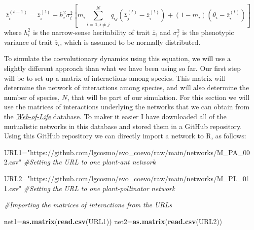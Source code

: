 \documentclass[
]{book}
\newenvironment{Shaded}{\begin{snugshade}}{\end{snugshade}}
\newcommand{\CommentTok}[1]{\textcolor[rgb]{0.56,0.35,0.01}{\textit{#1}}}
\newcommand{\FunctionTok}[1]{\textcolor[rgb]{0.13,0.29,0.53}{\textbf{#1}}}
\newcommand{\NormalTok}[1]{#1}
\newcommand{\OtherTok}[1]{\textcolor[rgb]{0.56,0.35,0.01}{#1}}
\newcommand{\StringTok}[1]{\textcolor[rgb]{0.31,0.60,0.02}{#1}}
\begin{document}
\[
\overline{z}_i^{(t+1)}=\overline{z}_i^{(t)}+h_{i}^2\sigma^2_{i}\left[m_{i}\sum_{i=1, i\neq j}^{N}q_{ij}(\overline{z}_j^{(t)}-\overline{z}_i^{(t)})+(1-m_{i})(\theta_{i}-\overline{z}_i^{(t)}) \right]
\] where \(h^2_{i}\) is the narrow-sense heritability of trait \(\overline{z}_i\) and \(\sigma^2_{i}\) is the phenotypic variance of trait \(\overline{z}_i\), which is assumed to be normally distributed.

To simulate the coevolutionary dynamics using this equation, we will use a slightly different approach than what we have been using so far. Our first step will be to set up a matrix of interactions among species. This matrix will determine the network of interactions among species, and will also determine the number of species, \(N\), that will be part of our simulation. For this section we will use the matrices of interactions underlying the networks that we can obtain from the \href{www.web-of-life.es}{\emph{Web-of-Life}} database. To maker it easier I have downloaded all of the mutualistic networks in this database and stored them in a GitHub repository. Using this GitHub repository we can directly import a network to R, as follows:

\begin{Shaded}
\begin{Highlighting}[]
\NormalTok{URL1}\OtherTok{=}\StringTok{"https://github.com/lgcosmo/evo\_coevo/raw/main/networks/M\_PA\_002.csv"} \CommentTok{\#Setting the URL to one plant{-}ant network}

\NormalTok{URL2}\OtherTok{=}\StringTok{"https://github.com/lgcosmo/evo\_coevo/raw/main/networks/M\_PL\_011.csv"} \CommentTok{\#Setting the URL to one plant{-}pollinator network}

\CommentTok{\#Importing the matrices of interactions from the URLs}

\NormalTok{net1}\OtherTok{=}\FunctionTok{as.matrix}\NormalTok{(}\FunctionTok{read.csv}\NormalTok{(URL1)) }
\NormalTok{net2}\OtherTok{=}\FunctionTok{as.matrix}\NormalTok{(}\FunctionTok{read.csv}\NormalTok{(URL2))}
\end{Highlighting}
\end{Shaded}
\end{document}
